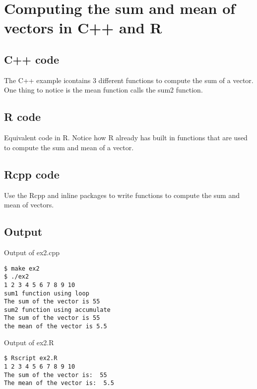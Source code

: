 \chapter{Computing the sum and mean of vectors in C++ and R}

\section{C++ code}
The C++ example icontains 3 different functions to compute the sum of a vector. One thing to notice is the mean function calls the sum2 function.

\lstset{language=C++, showspaces=false, showstringspaces=false}


\section{R code}
Equivalent code in R. Notice how R already has built in functions that are used to compute the sum and mean of a vector.

\lstset{language=R, showspaces=false, showstringspaces=false}


\section{Rcpp code}
Use the Rcpp and inline packages to write functions to compute the sum and mean of vectors.

\lstset{language=R, showspaces=false, showstringspaces=false}


\section{Output}

Output of ex2.cpp
\begin{verbatim}
$ make ex2
$ ./ex2
1 2 3 4 5 6 7 8 9 10 
sum1 function using loop
The sum of the vector is 55
sum2 function using accumulate
The sum of the vector is 55
the mean of the vector is 5.5
\end{verbatim}
Output of ex2.R
\begin{verbatim}
$ Rscript ex2.R
1 2 3 4 5 6 7 8 9 10 
The sum of the vector is:  55 
The mean of the vector is:  5.5 
\end{verbatim}
